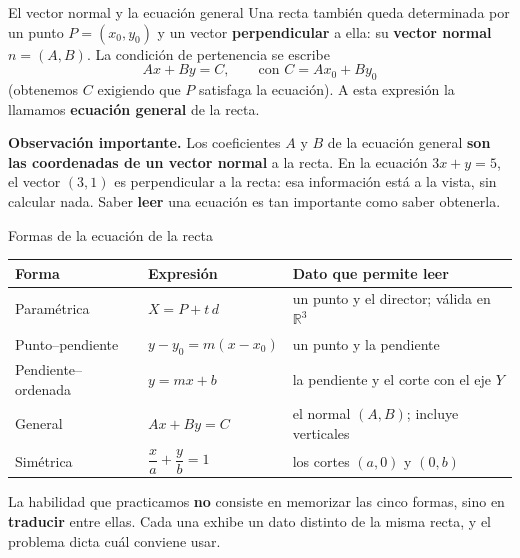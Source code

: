 \documentclass[aspectratio=169,10pt]{beamer}
\newcommand{\destaca}[1]{%
  \par\vspace{3pt}\noindent
  \colorbox{turquesaClaro}{%
    \parbox{\dimexpr\linewidth-2\fboxsep\relax}{\vspace{3pt}#1\vspace{3pt}}}%
  \par\vspace{3pt}}
\newcommand{\R}{\mathbb{R}}
\begin{document}
\begin{frame}{El vector normal y la ecuación general}
  Una recta también queda determinada por un punto $P=(x_0,y_0)$ y un
  vector \textbf{perpendicular} a ella: su \textbf{vector normal}
  $n=(A,B)$. La condición de pertenencia se escribe
  \[
    Ax+By=C, \qquad\text{con } C=Ax_0+By_0
  \]
  (obtenemos $C$ exigiendo que $P$ satisfaga la ecuación).
  A esta expresión la llamamos \textbf{ecuación general} de la recta.

  \vspace{0.3cm}
  \destaca{\textbf{Observación importante.} Los coeficientes $A$ y $B$
  de la ecuación general \textbf{son las coordenadas de un vector
  normal} a la recta. En la ecuación $3x+y=5$, el vector $(3,1)$ es
  perpendicular a la recta: esa información está a la vista, sin
  calcular nada. Saber \textbf{leer} una ecuación es tan importante
  como saber obtenerla.}
\end{frame}
\begin{frame}{Formas de la ecuación de la recta}
  \centering
  {\small
  \begin{tabular}{@{}lll@{}}
    \toprule
    \textbf{Forma} & \textbf{Expresión} & \textbf{Dato que permite leer} \\
    \midrule
    Paramétrica & $X=P+t\,d$ & un punto y el director; válida en $\R^3$ \\
    Punto--pendiente & $y-y_0=m(x-x_0)$ & un punto y la pendiente \\
    Pendiente--ordenada & $y=mx+b$ & la pendiente y el corte con el eje $Y$ \\
    General & $Ax+By=C$ & el normal $(A,B)$; incluye verticales \\
    Simétrica & $\dfrac{x}{a}+\dfrac{y}{b}=1$ & los cortes $(a,0)$ y $(0,b)$ \\
    \bottomrule
  \end{tabular}}

  \vspace{0.5cm}
  \raggedright
  \destaca{La habilidad que practicamos \textbf{no} consiste en
  memorizar las cinco formas, sino en \textbf{traducir} entre ellas.
  Cada una exhibe un dato distinto de la misma recta, y el problema
  dicta cuál conviene usar.}
\end{frame}
\end{document}

